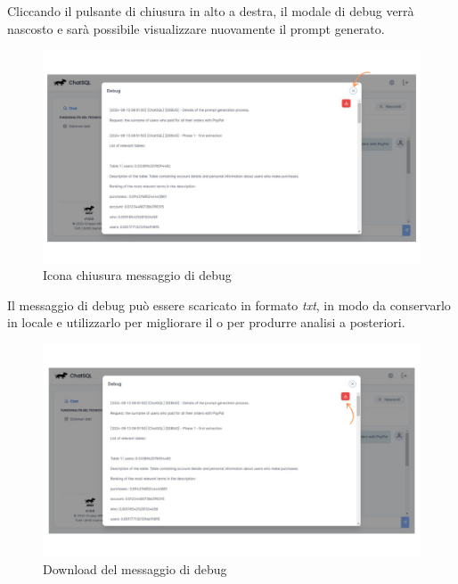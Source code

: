 \par Cliccando il pulsante di chiusura in alto a destra, il modale di debug verrà nascosto e sarà possibile visualizzare nuovamente il prompt generato.
\begin{figure}[H]
  \centering
  \includegraphics[width=\textwidth]{assets/tasto_close_debug.png}
  \caption{Icona chiusura messaggio di debug}
\end{figure}


Il messaggio di debug può essere scaricato in formato \textit{txt}, in modo da conservarlo in locale e utilizzarlo per migliorare il  o per produrre analisi a posteriori.
\begin{figure}[H]
  \centering
  \includegraphics[width=\textwidth]{assets/tasto_dawnload_debug.png}
  \caption{Download del messaggio di debug}
\end{figure}





